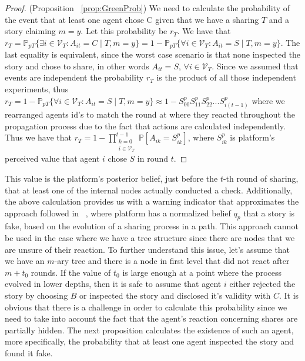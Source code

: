 \begin{proof}{(Proposition ~\ref{prop:GreenProb})}
	We need to calculate the probability of the event that at least one agent chose C given that we have a sharing $T$ and a story claiming $m=y$. Let this probability be $r_T$. We have that $ r_T=\mathbb{P}_{pT} \{\exists i \in \mathcal{V}_{T}: A_{it}=C \mid T,m=y \} = 1-\mathbb{P}_{pT} \{\forall i \in \mathcal{V}_{T}: A_{it}=S \mid T,m=y \}$. The last equality is equivalent, since the worst case scenario is that none inspected the story and chose to share, in other words $A_{it}=S$, $\forall i \in  \mathcal{V}_{T}$. Since we assumed that events are independent the probability $r_T$ is the product of all those independent experiments, thus $ r_T = 1-\mathbb{P}_{pT} \{\forall i \in \mathcal{V}_{T}: A_{it}=S \mid T,m=y \} \approx 1 - S_{00}^p S_{11}^p S_{22}^p . . .S_{i(t-1)}^p$ where we rearranged agents id's to match the round at where they reacted throughout the propagation process due to the fact that actions are calculated independently. Thus we have that $r_T =  1 - \displaystyle \prod\limits_{\substack{k = 0 \\ i \in \mathcal{V}_{T}}}^{t-1} \mathbb{P} [A_{ik} = S_{ik}^p]$, where $S_{ik}^p$ is platform's perceived value that agent $i$ chose $S$ in round $t$. 
\end{proof}
This value is the platform's posterior belief, just before the $t$-th round of sharing, that at least one of the internal nodes actually conducted a check. Additionally, the above calculation provides us with a warning indicator that approximates the approach followed in ~\cite{papanastasiou}, where platform has a normalized belief $q_p$ that a story is fake, based on the evolution of a sharing process in a path. This approach cannot be used in the case where we have a tree structure since there are nodes that we are unsure of their reaction. To further understand this issue, let's assume that we have an $m$-ary tree and there is a node in first level that did not react after $m+t_0$ rounds. If the value of $t_0$ is large enough at a point where the process evolved in lower depths, then it is safe to assume that agent $i$ either rejected the story by choosing $B$ or inspected the story and disclosed it's validity with $C$. It is obvious that there is a challenge in order to calculate this probability since we need to take into account the fact that the agent's reaction concerning shares are partially hidden. The next proposition calculates the existence of such an agent, more specifically, the probability that at least one agent inspected the story and found it fake.

